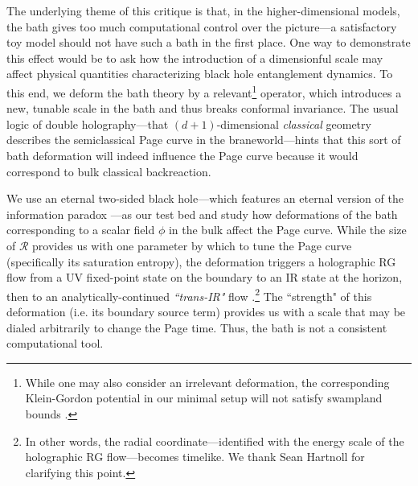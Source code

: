 \documentclass[12pt,a4paper]{article}
\begin{document}
The underlying theme of this critique is that, in the higher-dimensional models, the bath gives too much computational control over the picture---a satisfactory toy model should not have such a bath in the first place. One way to demonstrate this effect would be to ask how the introduction of a dimensionful scale may affect physical quantities characterizing black hole entanglement dynamics. To this end, we deform the bath theory by a relevant\footnote{While one may also consider an irrelevant deformation, the corresponding Klein-Gordon potential in our minimal setup will not satisfy swampland bounds \cite{Lust:2019zwm}.} operator, which introduces a new, tunable scale in the bath and thus breaks conformal invariance. The usual logic of double holography---that $(d+1)$-dimensional \textit{classical} geometry describes the semiclassical Page curve in the braneworld---hints that this sort of bath deformation will indeed influence the Page curve because it would correspond to bulk classical backreaction.

We use an eternal two-sided black hole---which features an eternal version of the information paradox \cite{Almheiri:2019yqk}---as our test bed and study how deformations of the bath corresponding to a scalar field $\phi$ in the bulk affect the Page curve. While the size of $\mathcal{R}$ provides us with one parameter by which to tune the Page curve (specifically its saturation entropy), the deformation triggers a holographic RG flow \cite{Balasubramanian:1999jd,deBoer:2000cz,Bianchi:2001kw,Fukuma:2002sb} from a UV fixed-point state on the boundary to an IR state at the horizon, then to an analytically-continued \textit{``trans-IR"} flow \cite{Frenkel:2020ysx}.\footnote{In other words, the radial coordinate---identified with the energy scale of the holographic RG flow---becomes timelike. We thank Sean Hartnoll for clarifying this point.} The ``strength" of this deformation (i.e. its boundary source term) provides us with a scale that may be dialed arbitrarily to change the Page time. Thus, the bath is not a consistent computational tool.
\end{document}
